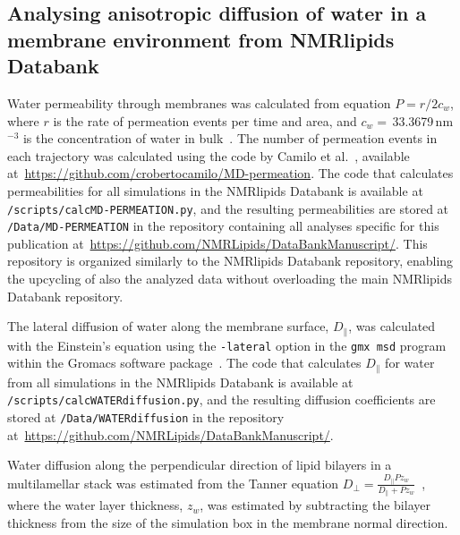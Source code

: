 \documentclass[fleqn,10pt]{wlscirep}
\begin{document}
\subsection{Analysing anisotropic diffusion of water in a membrane environment from NMRlipids Databank}

Water permeability through membranes was calculated from equation $P=r/2c_w$, where $r$ is the rate of permeation events per time and area, and $c_w=$\,33.3679\,nm$^{-3}$ is the concentration of water in bulk~\cite{venable19}. The number of permeation events in each trajectory was calculated using the code by Camilo et al.~\cite{camilo2022}, available at~\url{https://github.com/crobertocamilo/MD-permeation}. The code that calculates permeabilities for all simulations in the NMRlipids Databank is available at \texttt{/scripts/calcMD-PERMEATION.py}, and the resulting permeabilities are stored at \texttt{/Data/MD-PERMEATION} in the repository containing all analyses specific for this publication at~\url{https://github.com/NMRLipids/DataBankManuscript/}. This repository is organized similarly to the NMRlipids Databank repository, enabling the upcycling of also the analyzed data without overloading the main NMRlipids Databank repository. 

The lateral diffusion of water along the membrane surface, $D_\parallel$, was calculated with the Einstein's equation using the \texttt{-lateral} option in the \texttt{gmx\,msd} program within the Gromacs software package~\cite{gromacsMANUAL}. The code that calculates $D_\parallel$ for water from all simulations in the NMRlipids Databank is available at \texttt{/scripts/calcWATERdiffusion.py}, and the resulting diffusion coefficients are stored at \texttt{/Data/WATERdiffusion} in the repository at~\url{https://github.com/NMRLipids/DataBankManuscript/}.

Water diffusion along the perpendicular direction of lipid bilayers in a multilamellar stack was estimated from the Tanner equation $D_\mathrm{\perp} = \frac{D_\parallel P z_w}{D_\parallel + P z_w}$~\cite{tanner78,wasterby02}, where the water layer thickness, $z_w$, was estimated by subtracting the bilayer thickness from the size of the simulation box in the membrane normal direction.


\end{document}
